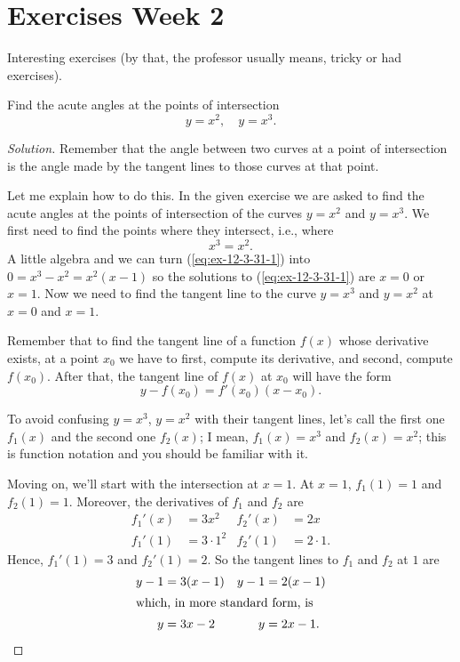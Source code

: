 \chapter{Exercises Week 2}
Interesting exercises (by that, the professor usually means, tricky or had
exercises).
\begin{exercise}[Stewart {\S}12.3, 31]
Find the acute angles at the points of intersection
\[
y=x^2,\quad y=x^3.
\]
\end{exercise}
\begin{proof}[Solution]
Remember that the angle between two curves at a point of intersection is
the angle made by the tangent lines to those curves at that point.

Let me explain how to do this. In the given exercise we are asked to find
the acute angles at the points of intersection of the curves $y=x^2$ and
$y=x^3$. We first need to find the points where they intersect, i.e., where
\begin{equation}
\label{eq:ex-12-3-31-1}
x^3=x^2.
\end{equation}
A little algebra and we can turn (\ref{eq:ex-12-3-31-1}) into
$0=x^3-x^2=x^2(x-1)$ so the solutions to (\ref{eq:ex-12-3-31-1}) are $x=0$
or $x=1$. Now we need to find the tangent line to the curve $y=x^3$ and
$y=x^2$ at $x=0$ and $x=1$.

Remember that to find the tangent line of a function $f(x)$ whose
derivative exists, at a point $x_0$ we have to first, compute its
derivative, and second, compute $f(x_0)$. After that, the tangent line of
$f(x)$ at $x_0$ will have the form
\[
y-f(x_0)=f'(x_0)(x-x_0).
\]

To avoid confusing $y=x^3$, $y=x^2$ with their tangent lines, let's call
the first one $f_1(x)$ and the second one $f_2(x)$; I mean, $f_1(x)=x^3$
and $f_2(x)=x^2$; this is function notation and you should be familiar with
it.

Moving on, we'll start with the intersection at $x=1$. At $x=1$, $f_1(1)=1$
and $f_2(1)=1$. Moreover, the derivatives of $f_1$ and $f_2$ are
\begin{align*}
f_1'(x)&=3x^2&f_2'(x)&=2x\\
f_1'(1)&=3\cdot 1^2&f_2'(1)&=2\cdot 1.
\end{align*}
Hence, $f_1'(1)=3$ and $f_2'(1)=2$. So the tangent lines to $f_1$ and $f_2$
at $1$ are
\begin{align}
\label{eq:ex-12-3-31-2}
y-1&=3(x-1)&y-1&=2(x-1)\nonumber\\
\intertext{which, in more standard form, is}
y&=3x-2&y&=2x-1.
\end{align}


\end{proof}
